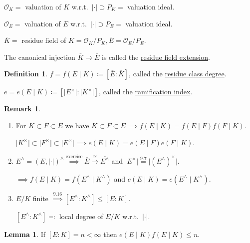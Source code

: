 \documentclass[openany]{amsbook}
\numberwithin{section}{chapter}
\theoremstyle{definition}
\newtheorem*{definition}{Definition}
\newtheorem*{remark}{Remark}
\newtheorem{lemma}[theorem]{Lemma}
\begin{document}
\(\mathcal{O}_K =\) valuation of \(K\) w.r.t.\ \(\vert \cdot \vert \supset P_K =\) valuation ideal.

\(\mathcal{O}_E =\) valuation of \(E\) w.r.t.\ \(\vert \cdot \vert \supset P_E =\) valuation ideal.

\(\overline{K} =\) residue field of \(K = \mathcal{O}_K / P_K, \overline{E} = \mathcal{O}_E / P_E\).

The canonical injection \(\overline{K} \to \overline{E}\) is called the \underline{residue field extension}.

\begin{definition}
    \(f = f(E \mid K) \coloneqq [\overline{E} : \overline{K} ]\), called the \underline{residue class degree}.

    \(e = e(E \mid K) \coloneqq [\vert E^\times  \vert : \vert K^\times \vert]\), called the \underline{ramification index}.
\end{definition}

\begin{remark}
    \begin{enumerate}[label=\arabic*)]
        \item For \(K \subset F \subset E\) we have \(\overline{K} \subset \overline{F} \subset \overline{E} \implies f(E \mid K) = f(E \mid F) f(F \mid K)\).
        
        \(\vert K^\times \vert \subset \vert F^\times \vert \subset \vert E^\times \vert \implies e(E \mid K) = e(E \mid F) e(F \mid K)\).

        \item \(E^\wedge = (E, \vert \cdot \vert)^\wedge \overset{\text{exercise}}{\implies} \overline{E} \overset{\cong}{\to} \overline{E^\wedge}\) and \(\vert E^\times \vert \overset{9.7}{=} \vert (E^\wedge)^\times \vert \).  
        
        \(\implies f(E \mid K) = f(E^\wedge \mid K^\wedge)\) and \(e(E \mid K) = e(E^\wedge \mid K^\wedge)\).

        \item \(E / K\) finite \(\overset{9.16}{\implies} [E^\wedge : K^\wedge] \leq [E:K]\).
        
        \([E^\wedge : K^\wedge] \eqqcolon\) local degree of \(E / K\) w.r.t.\ \(\vert \cdot \vert\).
    \end{enumerate} 
\end{remark}

\begin{lemma}
    If \([E:K] = n < \infty\) then \(e(E \mid K) f(E \mid K) \leq n\). 
\end{lemma}
\end{document}
